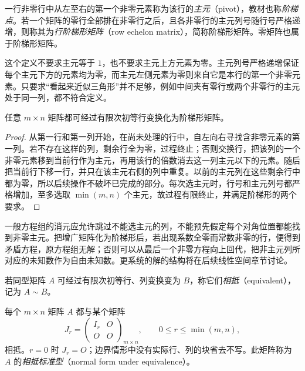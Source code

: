 \begin{definition}
\label{def:matrix-row-echelon}
一行非零行中从左至右的第一个非零元素称为该行的\emph{主元}（pivot），教材也称\emph{阶梯点}。若一个矩阵的零行全部排在非零行之后，且各非零行的主元列号随行号严格递增，则称其为\emph{行阶梯形矩阵}（row echelon matrix），简称阶梯形矩阵。零矩阵也属于阶梯形矩阵。
\end{definition}

这个定义不要求主元等于 $1$，也不要求主元上方元素为零。主元列号严格递增保证每个主元下方的元素均为零，而主元左侧元素为零则来自它是本行的第一个非零元素。只要求“看起来近似三角形”并不足够，例如中间夹有零行或两个非零行的主元处于同一列，都不符合定义。

\begin{theorem}[初等行变换化阶梯形]
\label{thm:matrix-row-echelon-reduction}
任意 $m\times n$ 矩阵都可经过有限次初等行变换化为阶梯形矩阵。
\end{theorem}

\begin{proof}
从第一行和第一列开始，在尚未处理的行中，自左向右寻找含非零元素的第一列。若不存在这样的列，剩余行全为零，过程终止；否则交换行，把该列的一个非零元素移到当前行作为主元，再用该行的倍数消去这一列主元以下的元素。随后把当前行下移一行，并只在该主元右侧的列中重复。以前的主元列在这些剩余行中都为零，所以后续操作不破坏已完成的部分。每次选主元时，行号和主元列号都严格增加，至多选取 $\min(m,n)$ 个主元，故过程有限终止，并满足阶梯形的两个要求。
\end{proof}

一般方程组的消元应允许跳过不能选主元的列，不能预先假定每个对角位置都能找到非零主元。把增广矩阵化为阶梯形后，若出现系数全零而常数非零的行，便得到矛盾方程，原方程组无解；否则可以从最后一个非零方程向上回代，把非主元列所对应的未知数作为自由未知数。更系统的解的结构将在后续线性空间章节讨论。

\begin{definition}
\label{def:matrix-equivalence}
若同型矩阵 $A$ 可经过有限次初等行、列变换变为 $B$，称它们\emph{相抵}（equivalent），记为 $A\sim B$。
\end{definition}

\begin{theorem}[相抵标准型的存在]
\label{thm:matrix-equivalence-normal-form}
每个 $m\times n$ 矩阵 $A$ 都与某个矩阵
\begin{equation}
\label{eq:matrix-equivalence-normal-form}
    J_r=\begin{pmatrix}I_r&O\\O&O\end{pmatrix}_{m\times n},
    \qquad 0\leq r\leq\min(m,n),
\end{equation}
相抵。$r=0$ 时 $J_r=O$；边界情形中没有实际行、列的块省去不写。此矩阵称为 $A$ 的\emph{相抵标准型}（normal form under equivalence）。
\end{theorem}

